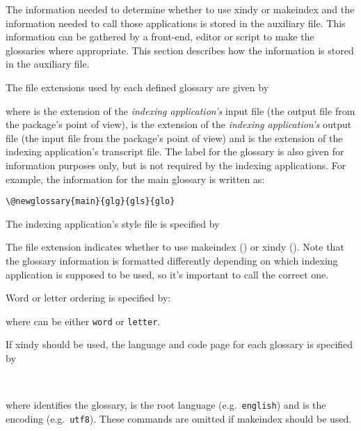 \documentclass{nlctdoc}
\begin{document}
The information needed to determine whether to use \gls{xindy}
or \gls{makeindex} and the information needed to call those
applications is stored in the auxiliary file. This information can
be gathered by a front-end, editor or script to make the glossaries
where appropriate. This section describes how the information is
stored in the auxiliary file.

The file extensions used by each defined glossary are given by
\begin{definition}[\DescribeMacro{\@newglossary}]
\end{definition}
where  is the extension of the \emph{indexing
application's} input file (the output file from the 
package's point of view),  is the extension of the
\emph{indexing application's} output file (the input file from
the  package's point of view) and  is the
extension of the indexing application's transcript file. The label
for the glossary is also given for information purposes only, but
is not required by the indexing applications. For example, the
information for the main glossary is written as:
\begin{verbatim}
\@newglossary{main}{glg}{gls}{glo}
\end{verbatim}

The indexing application's style file is specified by
\begin{definition}[\DescribeMacro{\@istfilename}]
\end{definition}
The file extension indicates whether to use \gls{makeindex}
() or \gls{xindy} (). Note that
the glossary information is formatted differently depending on
which indexing application is supposed to be used, so it's 
important to call the correct one.

Word or letter ordering is specified by:
\begin{definition}[\DescribeMacro{\@glsorder}]
\end{definition}
where  can be either \texttt{word} or \texttt{letter}.

If \gls{xindy} should be used, the language and code page
for each glossary is specified by
\begin{definition}[\DescribeMacro{\@xdylanguage}\DescribeMacro{\@gls@codepage}]
\\
\end{definition}
where  identifies the glossary,  is
the root language (e.g.\ \texttt{english}) and 
is the encoding (e.g.\ \texttt{utf8}). These commands are omitted
if \gls{makeindex} should be used.
\end{document}
